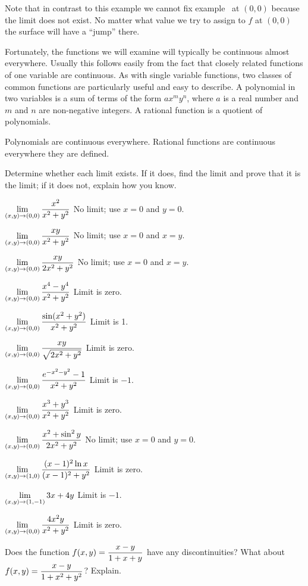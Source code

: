 Note that in contrast to this example we cannot fix
example~ at $(0,0)$ because the limit does not
exist. No matter what value we try to assign to $f$ at $(0,0)$ the
surface will have a ``jump'' there. 

Fortunately, the functions we will examine will typically be
continuous almost everywhere. Usually this follows easily from the
fact that closely related functions of one variable are continuous.
As with single variable functions, two classes of common functions are
particularly useful and easy to describe. A
polynomial in two
variables is a sum of terms of the form $ax^my^n$, where $a$ is a real
number and $m$ and $n$ are non-negative integers. A rational
function
is a quotient of polynomials.

\thm Polynomials are continuous everywhere. Rational functions are
continuous everywhere they are defined.
\endthmnoproof

\exercises

Determine whether each limit exists. If it does, find the limit
and prove that it is the limit; if it does not, explain how you know.

\exercise $\displaystyle\lim_{(x,y)\to(0,0)}{x^2\over x^2+y^2}$
\answer No limit; use $x=0$ and $y=0$.
\endanswer
\endexercise

\exercise $\displaystyle\lim_{(x,y)\to(0,0)}{xy\over x^2+y^2}$
\answer No limit; use $x=0$ and $x=y$.
\endanswer
\endexercise

\exercise $\displaystyle\lim_{(x,y)\to(0,0)}{xy\over 2x^2+y^2}$
\answer No limit; use $x=0$ and $x=y$.
\endanswer
\endexercise

\exercise $\displaystyle\lim_{(x,y)\to(0,0)}{x^4-y^4\over x^2+y^2}$
\answer Limit is zero.
\endanswer
\endexercise

\exercise $\displaystyle\lim_{(x,y)\to(0,0)}{\sin(x^2+y^2)\over x^2+y^2}$
\answer Limit is 1.
\endanswer
\endexercise

\exercise $\displaystyle\lim_{(x,y)\to(0,0)}{xy\over \sqrt{2x^2+y^2}}$
\answer Limit is zero.
\endanswer
\endexercise

\exercise $\displaystyle\lim_{(x,y)\to(0,0)} {e^{-x^2-y^2}-1\over x^2+y^2}$
\answer Limit is $-1$.
\endanswer
\endexercise

\exercise $\displaystyle\lim_{(x,y)\to(0,0)}{x^3+y^3\over x^2+y^2}$
\answer Limit is zero.
\endanswer
\endexercise

\exercise $\displaystyle\lim_{(x,y)\to(0,0)}{x^2 + \sin^2 y\over 2x^2+y^2}$
\answer No limit; use $x=0$ and $y=0$.
\endanswer
\endexercise

\exercise $\displaystyle\lim_{(x,y)\to(1,0)}{(x-1)^2\ln x\over(x-1)^2+y^2}$
\answer Limit is zero.
\endanswer
\endexercise

\exercise $\displaystyle\lim_{(x,y)\to(1,-1)}{3x+4y}$
\answer Limit is $-1$.
\endanswer
\endexercise

\exercise $\displaystyle\lim_{(x,y)\to(0,0)}{4x^2y\over x^2+y^2}$
\answer Limit is zero.
\endanswer
\endexercise

\exercise Does the function $\displaystyle f(x,y)={x-y\over 1+x+y}$ 
have any discontinuities?  What about 
$\displaystyle f(x,y)={x-y\over 1+x^2+y^2}$?  Explain.
\endexercise

\endexercises

